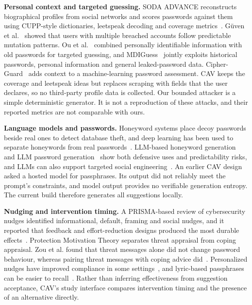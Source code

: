 \documentclass[conference]{IEEEtran}
\begin{document}
\textbf{Personal context and targeted guessing.} SODA ADVANCE reconstructs biographical profiles from social networks and scores passwords against them using CUPP-style dictionaries, leetspeak decoding and coverage metrics~\cite{atzori2024,atzori2025}. G\"uven et al.~\cite{guven} showed that users with multiple breached accounts follow predictable mutation patterns. Ou et al.~\cite{ou2026} combined personally identifiable information with old passwords for targeted guessing, and MDIGuess~\cite{mdiguess} jointly exploits historical passwords, personal information and general leaked-password data. Cipher-Guard~\cite{alatawi} adds context to a machine-learning password assessment. CAV keeps the coverage and leetspeak ideas but replaces scraping with fields that the user declares, so no third-party profile data is collected. Our bounded attacker is a simple deterministic generator. It is not a reproduction of these attacks, and their reported metrics are not comparable with ours.

\textbf{Language models and passwords.} Honeyword systems place decoy passwords beside real ones to detect database theft, and deep learning has been used to separate honeywords from real passwords~\cite{dani}. LLM-based honeyword generation~\cite{umejiaku2025} and LLM password generation~\cite{kagnici} show both defensive uses and predictability risks, and LLMs can also support targeted social engineering~\cite{sai}. An earlier CAV design asked a hosted model for passphrases. Its output did not reliably meet the prompt's constraints, and model output provides no verifiable generation entropy. The current build therefore generates all suggestions locally.

\textbf{Nudging and intervention timing.} A PRISMA-based review of cybersecurity nudges identified informational, default, framing and social nudges, and it reported that feedback and effort-reduction designs produced the most durable effects~\cite{arciulo}. Protection Motivation Theory separates threat appraisal from coping appraisal. Zou et al. found that threat messages alone did not change password behaviour, whereas pairing threat messages with coping advice did~\cite{zou}. Personalized nudges have improved compliance in some settings~\cite{peer}, and lyric-based passphrases can be easier to recall~\cite{wise}. Rather than inferring effectiveness from suggestion acceptance, CAV's study interface compares intervention timing and the presence of an alternative directly.
\end{document}
